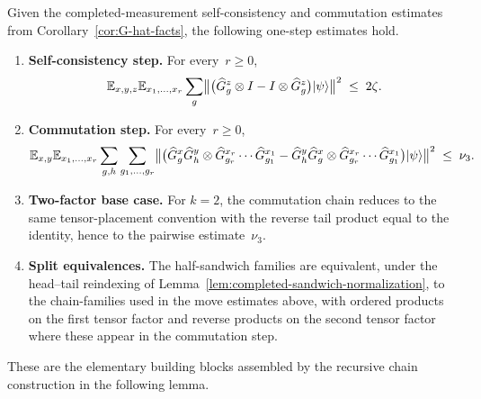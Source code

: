\begin{lemma}\label{lem:one-step-completed-sandwich-commutation}
	\leanok
	Given the completed-measurement self-consistency and commutation estimates
	from Corollary~\ref{cor:G-hat-facts}, the following one-step estimates hold.
	\begin{enumerate}
		\item \textbf{Self-consistency step.} For every~$r\ge 0$,
			\[
				\mathbb{E}_{x,y,z}\mathbb{E}_{x_1,\dots,x_r}
				\sum_{g}
				\bigl\|
				\bigl(\widehat G^{z}_g \otimes I -
					I \otimes \widehat G^{z}_g\bigr)
				\lvert \psi \rangle
				\bigr\|^2
				\;\le\; 2\zeta.
			\]
		\item \textbf{Commutation step.} For every~$r\ge 0$,
			\[
				\mathbb{E}_{x,y}\mathbb{E}_{x_1,\dots,x_r}
				\sum_{g,h}\sum_{g_1,\dots,g_r}
				\bigl\|
				\bigl(
					\widehat G^{x}_g \widehat G^{y}_h
					\otimes
					\widehat G^{x_r}_{g_r}\cdots
					\widehat G^{x_1}_{g_1}
					-
					\widehat G^{y}_h \widehat G^{x}_g
					\otimes
					\widehat G^{x_r}_{g_r}\cdots
					\widehat G^{x_1}_{g_1}
				\bigr)
				\lvert \psi \rangle
				\bigr\|^2
				\;\le\; \nu_3.
			\]
		\item \textbf{Two-factor base case.} For $k=2$, the commutation chain
			reduces to the same tensor-placement convention with the reverse
			tail product equal to the identity, hence to the pairwise
			estimate~$\nu_3$.
		\item \textbf{Split equivalences.} The half-sandwich families are
			equivalent, under the head--tail reindexing of
			Lemma~\ref{lem:completed-sandwich-normalization}, to the
			chain-families used in the move estimates above, with ordered
			products on the first tensor factor and reverse products on the
			second tensor factor where these appear in the commutation step.
	\end{enumerate}
	These are the elementary building blocks assembled by the recursive chain
	construction in the following lemma.
\end{lemma}
